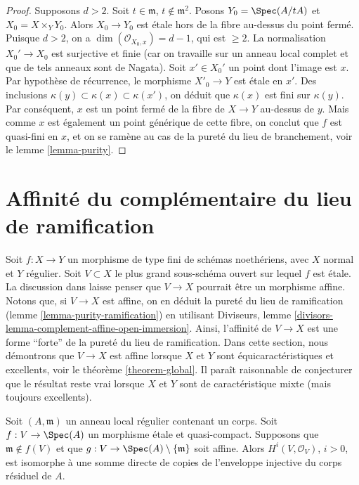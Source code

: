 \begin{proof}
\medskip\noindent
Supposons $d > 2$. Soit $t \in \mathfrak m$, $t \not \in \mathfrak m^2$.
Posons $Y_0 = \Spec(A/tA)$ et $X_0 = X \times_Y Y_0$.
Alors $X_0 \to Y_0$ est \'etale hors de la fibre au-dessus du point fermé.
Puisque $d > 2$, on a $\dim(\mathcal{O}_{X_0, x}) = d - 1$, qui est $\geq 2$.
La normalisation $X_0' \to X_0$ est surjective et finie
(car on travaille sur un anneau local complet et que de tels anneaux sont de Nagata).
Soit $x' \in X_0'$ un point dont l'image est $x$. Par hypothèse de récurrence, le
morphisme $X'_0 \to Y$ est \'etale en $x'$. Des inclusions
$\kappa(y) \subset \kappa(x) \subset \kappa(x')$,
on déduit que $\kappa(x)$ est fini sur $\kappa(y)$.
Par conséquent, $x$ est un point fermé de la fibre de $X \to Y$
au-dessus de $y$. Mais comme $x$ est également un point générique de
cette fibre, on conclut que $f$ est quasi-fini en $x$,
et on se ramène au cas de la pureté du lieu de branchement, voir le
lemme \ref{lemma-purity}.
\end{proof}




\section{Affinité du complémentaire du lieu de ramification}
\label{section-stronger-purity}

\noindent
Soit $f : X \to Y$ un morphisme de type fini de schémas noethériens,
avec $X$ normal et $Y$ régulier. Soit $V \subset X$ le plus grand
sous-schéma ouvert sur lequel $f$ est \'etale.
La discussion dans \cite[chapitre IV, section 21.12]{EGA}
laisse penser que $V \to X$ pourrait être un morphisme affine.
Notons que, si $V \to X$ est affine, on en déduit la pureté du
lieu de ramification (lemme \ref{lemma-purity-ramification}) en
utilisant Diviseurs, lemme \ref{divisors-lemma-complement-affine-open-immersion}.
Ainsi, l'affinité de $V \to X$ est une forme ``forte'' de la pureté
du lieu de ramification.
Dans cette section, nous démontrons que $V \to X$ est affine lorsque
$X$ et $Y$ sont équicaractéristiques et excellents, voir le
théorème \ref{theorem-global}. Il paraît raisonnable
de conjecturer que le résultat reste vrai lorsque $X$ et $Y$ sont
de caractéristique mixte (mais toujours excellents).

\begin{lemma}
\label{lemma-structure-cohomology}
Soit $(A, \mathfrak m)$ un anneau local régulier contenant un corps.
Soit $f : V \to \Spec(A)$ un morphisme \'etale et quasi-compact.
Supposons que $\mathfrak m \not \in f(V)$ et que
$g : V \to \Spec(A) \setminus \{\mathfrak m\}$ soit affine.
Alors $H^i(V, \mathcal{O}_V)$, $i > 0$, est isomorphe à une somme
directe de copies de l'enveloppe injective du corps résiduel de $A$.
\end{lemma}


